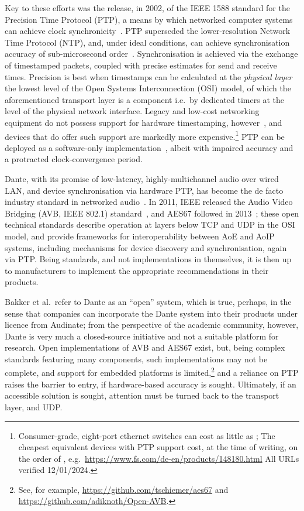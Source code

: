 Key to these efforts was the release, in 2002, of the IEEE 1588 standard for the
Precision Time Protocol (PTP), a means by which networked computer systems
can achieve clock synchronicity~\citep{edison_ieee-1588_2002}.
PTP superseded the lower-resolution Network Time Protocol (NTP), and, under
ideal conditions, can achieve synchronisation accuracy of sub-microsecond
order~\citep{tongzhou_research_2022}.
Synchronisation is achieved via the exchange of timestamped packets, coupled
with precise estimates for send and receive times.
Precision is best when timestamps can be calculated at the \textit{physical
layer} \textemdash{} the lowest level of the Open Systems Interconnection (OSI)
model, of which the aforementioned transport layer is a component \textemdash{}
i.e.\ by dedicated timers at the level of the physical network interface.
Legacy and low-cost networking equipment do not possess support for hardware
timestamping, however~\citep{correll_design_2005}, and devices that do offer
such support are markedly more expensive.\footnote{
    Consumer-grade, eight-port ethernet switches can cost as little as
    ;
    The cheapest equivalent devices with PTP support cost, at the time of
    writing, on the order of , e.g.\
    \url{https://www.fs.com/de-en/products/148180.html} \textemdash{} All URLs
    verified 12/01/2024.
}
PTP can be deployed as a software-only
implementation~\citep{correll_design_2005}, albeit with impaired accuracy and
a protracted clock-convergence period.

Dante, with its promise of low-latency, highly-multichannel audio over wired
LAN, and device synchronisation via hardware PTP, has become the de facto
industry standard in networked audio~\citep{bakker_introduction_2014}.
In 2011, IEEE released the Audio Video Bridging (AVB, IEEE 802.1)
standard~\citep{ieee_ieee_2011}, and AES67 followed in
2013~\citep{hildebrand_aes67-2013_2014};
these open technical standards describe operation at layers below TCP and UDP
in the OSI model, and provide frameworks for
interoperability between AoE and AoIP systems, including mechanisms for device
discovery and synchronisation, again via PTP\@.
Being standards, and not implementations in themselves, it is then up to
manufacturers to implement the appropriate recommendations in their products.

Bakker et al.\ refer to Dante as an ``open'' system, which is true, perhaps, in
the sense that companies can incorporate the Dante system into their products
under licence from Audinate;
from the perspective of the academic community, however, Dante is very much a
closed-source initiative and not a suitable platform for research.
Open implementations of AVB and AES67 exist, but, being complex standards
featuring many components, such implementations may not be complete, and support
for embedded platforms is limited,\footnote{
    See, for example, \url{https://github.com/tschiemer/aes67} and
    \url{https://github.com/adiknoth/Open-AVB}.
} and a reliance on PTP raises the barrier to entry, if hardware-based accuracy
is sought.
Ultimately, if an accessible solution is sought, attention must be turned back
to the transport layer, and UDP\@.

